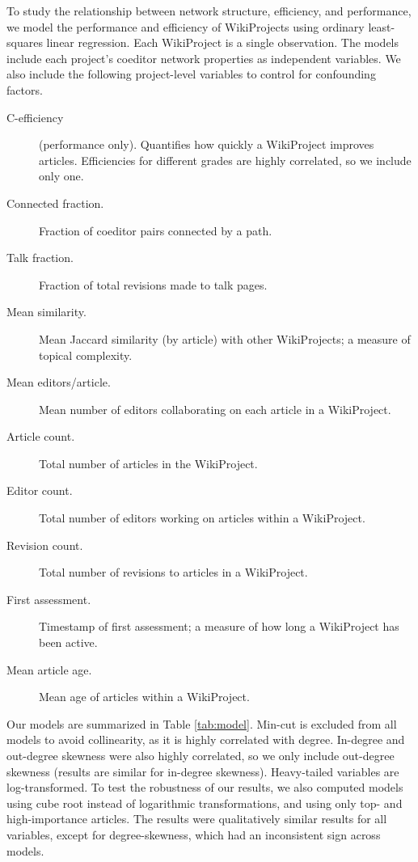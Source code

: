To study the relationship between network structure, efficiency, and performance,
we model the performance and efficiency of WikiProjects using ordinary least-squares linear regression.
Each WikiProject is a single observation.
The models include each project's coeditor network properties as independent variables.
We also include the following project-level variables to control for confounding factors.
\begin{description}
\item[C-efficiency]
(performance only).
Quantifies how quickly a WikiProject improves articles.
Efficiencies for different grades are highly correlated,
so we include only one.
\item[Connected fraction.]
Fraction of coeditor pairs connected by a path.
\item[Talk fraction.] Fraction of total revisions made to talk pages.
\item[Mean similarity.] Mean Jaccard similarity (by article) with other WikiProjects; a measure of topical complexity.
\item[Mean editors/article.] Mean number of editors collaborating on each article in a WikiProject.
\item[Article count.] Total number of articles in the WikiProject.
\item[Editor count.] Total number of editors working on articles within a WikiProject.
\item[Revision count.] Total number of revisions to articles in a WikiProject.
\item[First assessment.] Timestamp of first assessment; a measure of how long a WikiProject has been active.
\item[Mean article age.] Mean age of articles within a WikiProject.
\end{description}

Our models are summarized in Table \ref{tab:model}.
Min-cut is excluded from all models to avoid collinearity,
as it is highly correlated with degree.
In-degree and out-degree skewness were also highly correlated,
so we only include out-degree skewness
(results are similar for in-degree skewness).
Heavy-tailed variables are log-transformed.
To test the robustness of our results,
we also computed models using cube root instead of logarithmic transformations,
and using only top- and high-importance articles.
The results were qualitatively similar results for all variables,
except for degree-skewness, which had an inconsistent sign across models.

